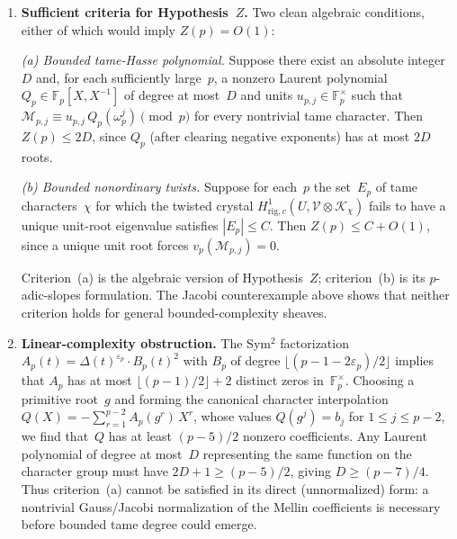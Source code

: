 \documentclass[11pt]{article}
\theoremstyle{definition}
\theoremstyle{remark}
\begin{document}
\begin{enumerate}
\item \textbf{Sufficient criteria for Hypothesis~$Z$.}
Two clean algebraic conditions, either of which
would imply $Z(p) = O(1)$:

\emph{(a) Bounded tame-Hasse polynomial.}
Suppose there exist an absolute integer $D$
and, for each sufficiently large~$p$,
a nonzero Laurent polynomial
$Q_p \in \mathbb{F}_p[X, X^{-1}]$
of degree at most~$D$ and units
$u_{p,j} \in \mathbb{F}_p^\times$ such that
$\mathscr{M}_{p,j} \equiv u_{p,j}\, Q_p(\omega_p^j)
\pmod{p}$ for every nontrivial tame character.
Then $Z(p) \le 2D$, since $Q_p$
(after clearing negative exponents)
has at most $2D$ roots.

\emph{(b) Bounded nonordinary twists.}
Suppose for each~$p$ the set~$E_p$
of tame characters~$\chi$ for which
the twisted crystal
$H^1_{\mathrm{rig},c}(U, \mathcal{V}
\otimes \mathcal{K}_\chi)$
fails to have a unique unit-root eigenvalue
satisfies $|E_p| \le C$.
Then $Z(p) \le C + O(1)$,
since a unique unit root forces
$v_p(\mathscr{M}_{p,j}) = 0$.

Criterion~(a) is the algebraic version of
Hypothesis~$Z$; criterion~(b) is its
$p$-adic-slopes formulation.
The Jacobi counterexample above shows that
neither criterion holds for general
bounded-complexity sheaves.

\item \textbf{Linear-complexity obstruction.}
The Sym$^2$ factorization
$A_p(t) = \Delta(t)^{\varepsilon_p}\cdot B_p(t)^2$
with $B_p$ of degree
$\lfloor(p{-}1{-}2\varepsilon_p)/2\rfloor$
implies that $A_p$ has at most
$\lfloor(p{-}1)/2\rfloor + 2$ distinct zeros
in~$\mathbb{F}_p^\times$.
Choosing a primitive root~$g$ and forming the
canonical character interpolation
$Q(X) = -\sum_{r=1}^{p-2} A_p(g^r)\, X^r$,
whose values $Q(g^j) = b_j$
for $1 \le j \le p{-}2$, we find that~$Q$
has at least $(p{-}5)/2$ nonzero coefficients.
Any Laurent polynomial of degree at most~$D$
representing the same function on the character
group must have $2D + 1 \ge (p{-}5)/2$,
giving $D \ge (p{-}7)/4$.
Thus criterion~(a) cannot be satisfied
in its direct (unnormalized) form:
a nontrivial Gauss/Jacobi normalization
of the Mellin coefficients is necessary
before bounded tame degree could emerge.


\end{enumerate}
\end{document}
